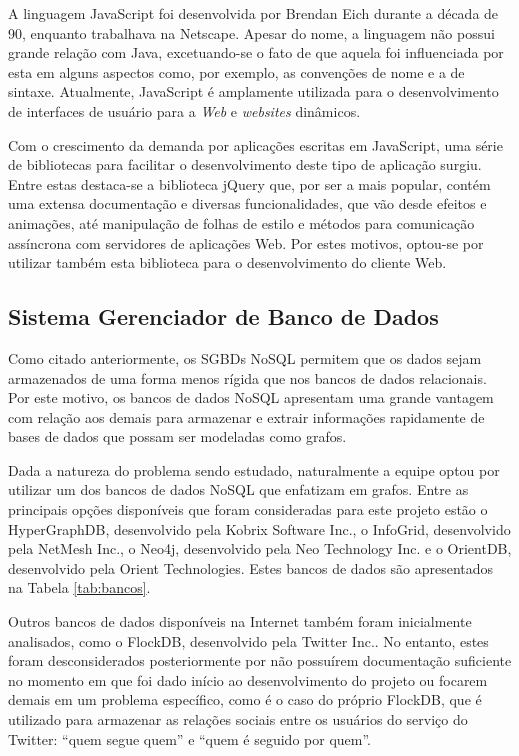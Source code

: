 A linguagem JavaScript foi desenvolvida por Brendan Eich durante a década de 90, enquanto trabalhava na Netscape.
Apesar do nome, a linguagem não possui grande relação com Java, excetuando-se o fato de que aquela foi influenciada por esta em alguns aspectos como, por exemplo, as convenções de nome e a de sintaxe.
Atualmente, JavaScript é amplamente utilizada para o desenvolvimento de interfaces de usuário para a \emph{Web} e \emph{websites} dinâmicos.

Com o crescimento da demanda por aplicações escritas em JavaScript, uma série de bibliotecas para facilitar o desenvolvimento deste tipo de aplicação surgiu.
Entre estas destaca-se a biblioteca jQuery que, por ser a mais popular, contém uma extensa documentação e diversas funcionalidades, que vão desde efeitos e animações, até manipulação de folhas de estilo e métodos para comunicação assíncrona com servidores de aplicações Web.
Por estes motivos, optou-se por utilizar também esta biblioteca para o desenvolvimento do cliente Web.

\subsection{Sistema Gerenciador de Banco de Dados}


Como citado anteriormente, os SGBDs NoSQL permitem que os dados sejam armazenados de uma forma menos rígida que nos bancos de dados relacionais.
Por este motivo, os bancos de dados NoSQL apresentam uma grande vantagem com relação aos demais para armazenar e extrair informações rapidamente de bases de dados que possam ser modeladas como grafos. %

Dada a natureza do problema sendo estudado, naturalmente a equipe optou por utilizar um dos bancos de dados NoSQL que enfatizam em grafos.
Entre as principais opções disponíveis que foram consideradas para este projeto estão o HyperGraphDB, desenvolvido pela Kobrix Software Inc., o InfoGrid, desenvolvido pela NetMesh Inc., o Neo4j, desenvolvido pela Neo Technology Inc. e o OrientDB, desenvolvido pela Orient Technologies.
Estes bancos de dados são apresentados na Tabela \ref{tab:bancos}.

Outros bancos de dados disponíveis na Internet também foram inicialmente analisados, como o FlockDB, desenvolvido pela Twitter Inc..
No entanto, estes foram desconsiderados posteriormente por não possuírem documentação suficiente no momento em que foi dado início ao desenvolvimento do projeto ou focarem demais em um problema específico, como é o caso do próprio FlockDB, que é utilizado para armazenar as relações sociais entre os usuários do serviço do Twitter: ``quem segue quem'' e ``quem é seguido por quem''.

